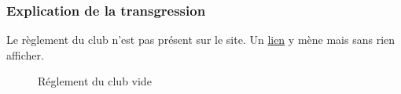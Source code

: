 \documentclass{article}[12pt]
\begin{document}
     \subsubsection*{Explication de la transgression}
     Le règlement du club n'est pas présent sur le site. Un \href{http://www.tennisclubdeparis.fr/reglement.html}{lien}  y mène mais sans rien afficher.
    
     \begin{figure}[H]
     	\centering
     	\caption{Réglement du club vide}
     \end{figure}
     \newpage
\end{document}
